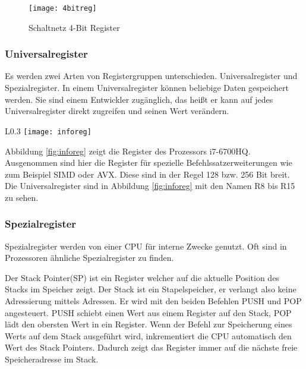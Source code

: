 \documentclass[12pt]{article}
\begin{document}
\newpage
\label{page:4bitreg}
\begin{figure}[!htb]
\centering
\caption{Schaltnetz 4-Bit Register}
\texttt{[image: 4bitreg]}
\centering
\label{fig:4bitreg}
\end{figure}
\newpage


\subsubsection{Universalregister}
Es werden zwei Arten von Registergruppen unterschieden. Universalregister und Spezialregister. In einem Universalregister können beliebige Daten gespeichert werden. Sie sind einem Entwickler zugänglich, das heißt er kann auf jedes Universalregister direkt zugreifen und seinen Wert verändern. 



\begin{wrapfigure}{L}{0.3\textwidth}
\centering
\texttt{[image: inforeg]}
\centering
\caption{Ausgabe des GDB-Befehls ''info registers''}
\label{fig:inforeg}
\end{wrapfigure}

\noindent Abbildung \ref{fig:inforeg} zeigt die Register des Prozessors i7-6700HQ. Ausgenommen sind hier die Register für spezielle Befehlssatzerweiterungen wie zum Beispiel SIMD oder AVX. Diese sind in der Regel 128 bzw. 256 Bit breit. Die Universalregister sind in Abbildung \ref{fig:inforeg} mit den Namen R8 bis R15 zu sehen.
\subsubsection{Spezialregister}
Spezialregister werden von einer CPU für interne Zwecke genutzt. Oft sind in Prozessoren ähnliche Spezialregister zu finden. 

\par \bigskip
\noindent Der Stack Pointer(SP) ist ein Register welcher auf die aktuelle Position des Stacks im Speicher zeigt. Der Stack ist ein Stapelspeicher, er verlangt also keine Adressierung mittels Adressen. Er wird mit den beiden Befehlen PUSH und POP angesteuert. PUSH schiebt einen Wert aus einem Register auf den Stack, POP lädt den obersten Wert in ein Register.  Wenn der Befehl zur Speicherung eines Werts auf dem Stack ausgeführt wird, inkrementiert die CPU automatisch den Wert des Stack Pointers. Dadurch zeigt das Register immer auf die nächste freie Speicheradresse im Stack.
\end{document}
